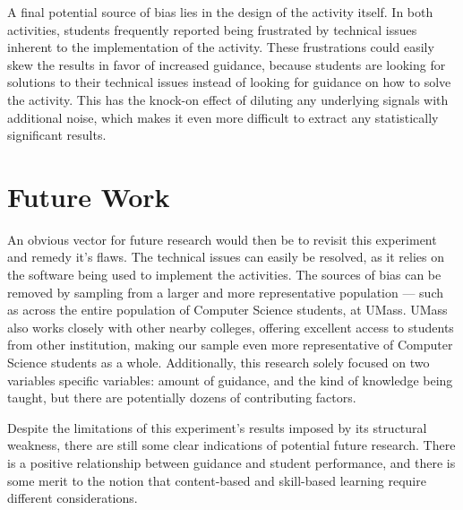     A final potential source of bias lies in the design of the activity itself. 
    In both activities, students frequently reported being frustrated by technical issues inherent to the implementation of the activity. 
    These frustrations could easily skew the results in favor of increased guidance, because students are looking for solutions to their technical issues instead of looking for guidance on how to solve the activity. 
    This has the knock-on effect of diluting any underlying signals with additional noise, which makes it even more difficult to extract any statistically significant results.

\section{Future Work}
    An obvious vector for future research would then be to revisit this experiment and remedy it's flaws. 
    The technical issues can easily be resolved, as it relies on the software being used to implement the activities. 
    The sources of bias can  be removed by sampling from a larger and more representative population --- such as across the entire population of Computer Science students, at UMass. 
    UMass also works closely with other nearby colleges, offering excellent access to students from other institution, making our sample even more representative of Computer Science students as a whole. 
    Additionally, this research solely focused on two variables specific variables: 
    amount of guidance, and the kind of knowledge being taught, but there are potentially dozens of contributing factors. 

    Despite the limitations of this experiment's results imposed by its structural weakness, there are still some clear indications of potential future research. There is a positive relationship between guidance and student performance, and there is some merit to the notion that content-based and skill-based learning require different considerations. 
    

